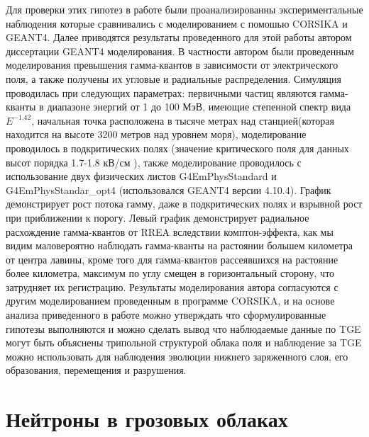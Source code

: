 Для проверки этих гипотез в работе были проанализированны экспериментальные наблюдения которые сравнивались с моделированием с помошью CORSIKA и GEANT4. Далее приводятся результаты проведенного для этой работы  автором диссертации GEANT4 моделирования. В частности автором были проведенным моделирования превышения гамма-квантов в зависимости от электрического поля, а также получены их угловые и радиальные распределения. Симуляция проводилась при следующих параметрах: первичными частиц являются гамма-кванты в диапазоне энергий от 1 до 100 МэВ, имеющие степенной спектр вида $E^{-1.42}$, начальная точка расположена в тысяче метрах над станцией(которая находится на высоте 3200 метров над уровнем моря), моделирование проводилось в подкритических полях (значение критического поля для данных высот порядка 1.7-1.8 кВ/см
), также моделирование проводилось с использование двух физических листов G4EmPhysStandard и G4EmPhysStandar\_opt4 (использовался GEANT4 версии 4.10.4). График демонстрирует рост потока гамму, даже в подкритических полях и взрывной рост при приближении к порогу. Левый график демонстрирует радиальное расхождение гамма-квантов от RREA вследствии комптон-эффекта, как мы видим маловероятно наблюдать гамма-кванты на растоянии большем километра от центра лавины, кроме того для гамма-квантов рассеявшихся на растояние более километра, максимум по углу смещен в горизонтальный сторону, что затрудняет их регистрацию. Результаты моделирования автора согласуются с другим моделированием проведенным в программе CORSIKA, и на основе анализа приведенного в работе можно утверждать что сформулированные гипотезы выполняются и можно сделать вывод что наблюдаемые данные по TGE могут быть объяснены трипольной структурой облака поля и наблюдение за TGE можно использовать для наблюдения эволюции нижнего заряженного слоя, его образования, перемещения и разрушения.






\section{Нейтроны в грозовых облаках}\label{sec:thunderstorm/review-exp} 

